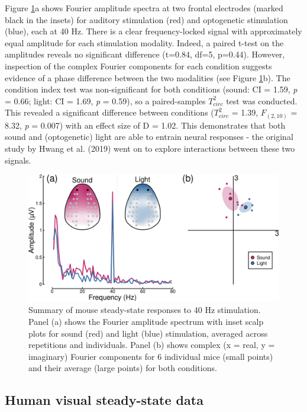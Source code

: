 \documentclass[]{article}
\begin{document}
Figure \ref{fig:mousedata}a shows Fourier amplitude spectra at two frontal electrodes (marked black in the insets) for auditory stimulation (red) and optogenetic stimulation (blue), each at 40 Hz. There is a clear frequency-locked signal with approximately equal amplitude for each stimulation modality. Indeed, a paired t-test on the amplitudes reveals no significant difference (t=0.84, df=5, p=0.44). However, inspection of the complex Fourier components for each condition suggests evidence of a phase difference between the two modalities (see Figure \ref{fig:mousedata}b). The condition index test was non-significant for both conditions (sound: CI = 1.59, \emph{p} = 0.66; light: CI = 1.69, \emph{p} = 0.59), so a paired-samples \(T^2_{circ}\) test was conducted. This revealed a significant difference between conditions (\(T^2_{circ}\) = 1.39, \(F_{(2,10)}\) = 8.32, \emph{p} = 0.007) with an effect size of D = 1.02. This demonstrates that both sound and (optogenetic) light are able to entrain neural responses - the original study by Hwang et al. (2019) went on to explore interactions between these two signals.

\begin{figure}

{\centering \includegraphics{manuscript_files/figure-latex/mousedata-1} 

}

\caption{Summary of mouse steady-state responses to 40 Hz stimulation. Panel (a) shows the Fourier amplitude spectrum with inset scalp plots for sound (red) and light (blue) stimulation, averaged across repetitions and individuals. Panel (b) shows complex (x = real, y = imaginary) Fourier components for 6 individual mice (small points) and their average (large points) for both conditions.}\label{fig:mousedata}
\end{figure}

\hypertarget{human-visual-steady-state-data}{%
\subsection{Human visual steady-state data}\label{human-visual-steady-state-data}}
\end{document}
